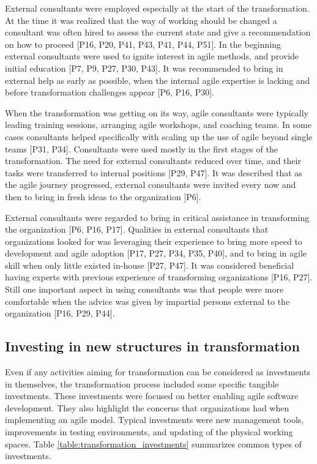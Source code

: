 
External consultants were employed especially at the start of the
transformation. At the time it was realized that the way of working should be
changed a consultant was often hired to assess the current state and give a
recommendation on how to proceed [P16, P20, P41, P43, P41, P44, P51].
In the beginning external consultants were used to ignite interest in agile
methods, and provide initial education [P7, P9, P27, P30, P43].
It was recommended to bring in external help as early as possible, when the
internal agile expertise is lacking and before transformation challenges appear
[P6, P16, P30].

When the transformation was getting on its way, agile consultants were typically
leading training sessions, arranging agile workshops, and coaching teams.
In some cases consultants helped specifically with scaling up the use of agile
beyond single teams [P31, P34].
Consultants were used mostly in the first stages of the transformation.
The need for external consultants reduced over time, and their tasks were
transferred to internal positions [P29, P47].
It was described that as the agile journey progressed, external consultants were
invited every now and then to bring in fresh ideas to the organization [P6].

External consultants were regarded to bring in critical assistance in
transforming the organization [P6, P16, P17]. Qualities in external consultants
that organizations looked for was leveraging their experience to bring more
speed to development and agile adoption [P17, P27, P34, P35, P40], and to bring
in agile skill when only little existed in-house [P27, P47]. It was considered
beneficial having experts with previous experience of transforming organizations
[P16, P27].
Still one important aspect in using consultants was that people were more
comfortable when the advice was given by impartial persons external to the
organization [P16, P29, P44].



\subsection{Investing in new structures in transformation}

Even if any activities aiming for transformation can be considered as
investments in themselves, the transformation process included some specific
tangible investments. These investments were focused on better enabling agile
software development. They also highlight the concerns that organizations had
when implementing an agile model. Typical investments were new management tools,
improvements in testing environments, and updating of the physical working
spaces. Table \ref{table:transformation_investments} summarizes common types of
investments.


